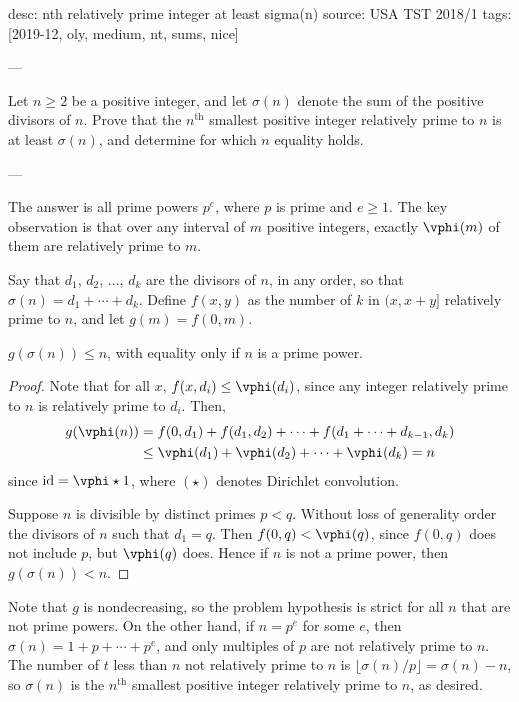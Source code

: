 desc: nth relatively prime integer at least sigma(n)
source: USA TST 2018/1
tags: [2019-12, oly, medium, nt, sums, nice]

---

Let $n\ge2$ be a positive integer, and let $\sigma(n)$ denote the sum of the positive divisors of $n$. Prove that the $n^\text{th}$ smallest positive integer relatively prime to $n$ is at least $\sigma(n)$, and determine for which $n$ equality holds.

---

The answer is all prime powers $p^e$, where $p$ is prime and $e\ge1$. The key observation is that over any interval of $m$ positive integers, exactly $\vphi(m)$ of them are relatively prime to $m$.

Say that $d_1$, $d_2$, $\ldots$, $d_k$ are the divisors of $n$, in any order, so that $\sigma(n)=d_1+\cdots+d_k$. Define $f(x,y)$ as the number of $k$ in $(x,x+y]$ relatively prime to $n$, and let $g(m)=f(0,m)$.
\begin{claim*}
    $g(\sigma(n))\le n$, with equality only if $n$ is a prime power.
\end{claim*}
\begin{proof}
    Note that for all $x$, $f(x,d_i)\le\vphi(d_i)$, since any integer relatively prime to $n$ is relatively prime to $d_i$. Then,
    \begin{align*}
        g(\vphi(n))&=f(0,d_1)+f(d_1,d_2)+\cdots+f(d_1+\cdots+d_{k-1},d_k)\\
        &\le\vphi(d_1)+\vphi(d_2)+\cdots+\vphi(d_k)=n
    \end{align*}
    since $\operatorname{id}=\vphi\star1$, where $(\star)$ denotes Dirichlet convolution.

    Suppose $n$ is divisible by distinct primes $p<q$. Without loss of generality order the divisors of $n$ such that $d_1=q$. Then $f(0,q)<\vphi(q)$, since $f(0,q)$ does not include $p$, but $\vphi(q)$ does. Hence if $n$ is not a prime power, then $g(\sigma(n))<n$.
\end{proof}

Note that $g$ is nondecreasing, so the problem hypothesis is strict for all $n$ that are not prime powers. On the other hand, if $n=p^e$ for some $e$, then $\sigma(n)=1+p+\cdots+p^e$, and only multiples of $p$ are not relatively prime to $n$. The number of $t$ less than $n$ not relatively prime to $n$ is $\lfloor\sigma(n)/p\rfloor=\sigma(n)-n$, so $\sigma(n)$ is the $n^\text{th}$ smallest positive integer relatively prime to $n$, as desired.
